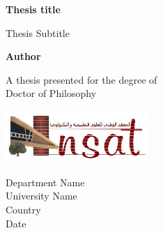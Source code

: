 \begin{titlepage}
    \begin{center}

        \vspace*{1cm}

        \Huge
        \textbf{Thesis title}

        \vspace{0.5cm}
        \LARGE
        Thesis Subtitle

        \vspace{1.5cm}

        \textbf{Author}

        \vfill


        A thesis presented for the degree of\\
        Doctor of Philosophy

        \vspace{0.8cm}

        \includegraphics[width=0.4\textwidth]{images/logo-insat.png}

        \Large
        Department Name\\
        University Name\\
        Country\\
        Date

    \end{center}
\end{titlepage}